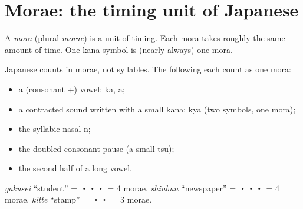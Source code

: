 \section{Morae: the timing unit of Japanese}

\begin{definition}[Mora]
A \emph{mora} (plural \emph{morae}) is a unit of timing. Each mora takes roughly the same
amount of time. One kana symbol is (nearly always) one mora.
\end{definition}

Japanese counts in morae, not syllables. The following each count as one mora:
\begin{itemize}
  \item a (consonant +) vowel:  ka,  a;
  \item a contracted sound written with a small kana:  kya (two symbols, one mora);
  \item the syllabic nasal  n;
  \item the doubled-consonant pause  (a small tsu);
  \item the second half of a long vowel.
\end{itemize}

\begin{center}
\end{center}

\begin{example}
 \emph{gakusei} ``student'' = ・・・ = 4 morae.
 \emph{shinbun} ``newspaper'' = ・・・ = 4 morae.
 \emph{kitte} ``stamp'' = ・・ = 3 morae.
\end{example}

